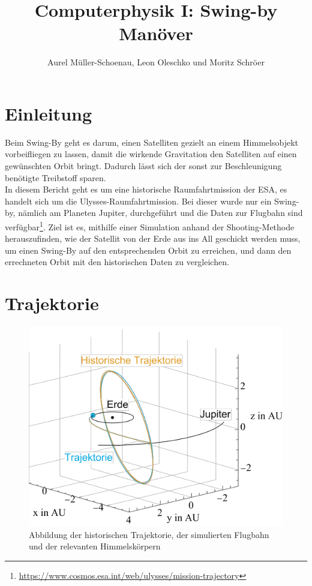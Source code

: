 





\title{Computerphysik I: Swing-by Manöver}
\author{Aurel Müller-Schoenau, Leon Oleschko und Moritz Schröer}
\maketitle

\begin{abstract}	
\end{abstract}

\section{Einleitung}
Beim Swing-By geht es darum, einen Satelliten gezielt an einem Himmelsobjekt vorbeifliegen zu lassen, damit die wirkende Gravitation den Satelliten auf einen gewünschten Orbit bringt. Dadurch lässt sich der sonst zur Beschleunigung benötigte Treibstoff sparen.\\
In diesem Bericht geht es um eine historische Raumfahrtmission der ESA, es handelt sich um die Ulysses-Raumfahrtmission. Bei dieser wurde nur ein Swing-by, nämlich am Planeten Jupiter, durchgeführt und die Daten zur Flugbahn sind verfügbar\footnote{\url{https://www.cosmos.esa.int/web/ulysses/mission-trajectory}}. Ziel ist es, mithilfe einer Simulation anhand der Shooting-Methode herauszufinden, wie der Satellit von der Erde aus ins All geschickt werden muss, um einen Swing-By auf den entsprechenden Orbit zu erreichen, und dann den errechneten Orbit mit den historischen Daten zu vergleichen.

\section{Trajektorie}
\begin{figure}[h!]
	\centering
	\includegraphics{img/trajectory.pdf}
	\caption{Abbildung der historischen Trajektorie, der simulierten Flugbahn und der relevanten Himmelskörpern}
	\label{fig:trajectory}
\end{figure}


